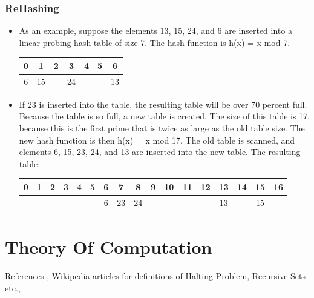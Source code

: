 \documentclass[a4paper,oneside]{book}
\begin{document}
\section{ReHashing}
\begin{itemize}
  \item As an example, suppose the elements 13, 15, 24, and 6 are inserted into a linear
probing hash table of size 7. The hash function is h(x) = x mod 7.
\begin{tabular}[H]{|ccccccc|}
\hline
0 & 1 & 2 & 3 & 4 & 5 & 6 \\ \hline
6 & 15  &   & 24  &   &   &  13 \\ \hline 
\end{tabular}
\item If 23 is inserted into the table, the resulting table will be over 70 percent
full. Because the table is so full, a new table is created. The size of this table is 17, because
this is the first prime that is twice as large as the old table size. The new hash function is
then h(x) = x mod 17. The old table is scanned, and elements 6, 15, 23, 24, and 13 are
inserted into the new table. The resulting table:\\
\begin{tabular}[H]{|ccccccccccccccccc|}
\hline
0 & 1 & 2 & 3 & 4 & 5 & 6 & 7 & 8 & 9 & 10 & 11 & 12 & 13 & 14 & 15 & 16 \\ \hline 
  &   &   &   &   &   & 6 & 23 & 24 &  &  &  &  & 13 &  & 15 &  \\ \hline
\end{tabular}
\end{itemize}




\part{Theory Of Computation}
References \cite{ullman1979introduction}, Wikipedia articles for definitions of Halting Problem, Recursive Sets etc., \newpage
\end{document}
